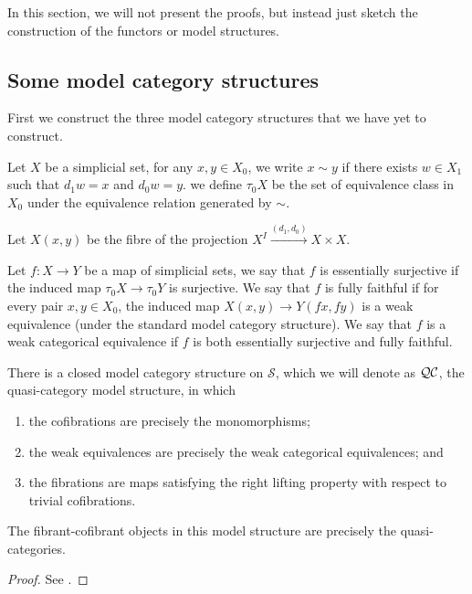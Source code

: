 In this section, we will not present the proofs, but instead just sketch the construction of the functors or model structures.

\subsection{Some model category structures}
First we construct the three model category structures that we have yet to construct.

\begin{defin}
Let $X$ be a simplicial set, for any $x,y\in X_0$, we write $x\sim y$ if there exists $w\in X_1$ such that $d_1w=x$ and $d_0w=y$. we define $\tau_0X$ be the set of equivalence class in $X_0$ under the equivalence relation generated by $\sim$.

Let $X(x,y)$ be the fibre of the projection $X^I\xrightarrow{(d_1,d_0)} X\times X$.

Let $f:X\to Y$ be a map of simplicial sets, we say that $f$ is essentially surjective if the induced map $\tau_0X\to\tau_0Y$ is surjective. We say that $f$ is fully faithful if for every pair $x,y\in X_0$, the induced map $X(x,y)\to Y(fx,fy)$ is a weak equivalence (under the standard model category structure). We say that $f$ is a weak categorical equivalence if $f$ is both essentially surjective and fully faithful.
\end{defin}
\begin{thm}
There is a closed model category structure on $\mathcal S$, which we will denote as ${\cal QC}$, the quasi-category model structure, in which
\begin{enumerate}
\item the cofibrations are precisely the monomorphisms;
\item the weak equivalences are precisely the weak categorical equivalences; and
\item the fibrations are maps satisfying the right lifting property with respect to trivial cofibrations.
\end{enumerate}
The fibrant-cofibrant objects in this model structure are precisely the quasi-categories.
\end{thm}

\begin{proof}
See \cite{joyal2}.
\end{proof}

